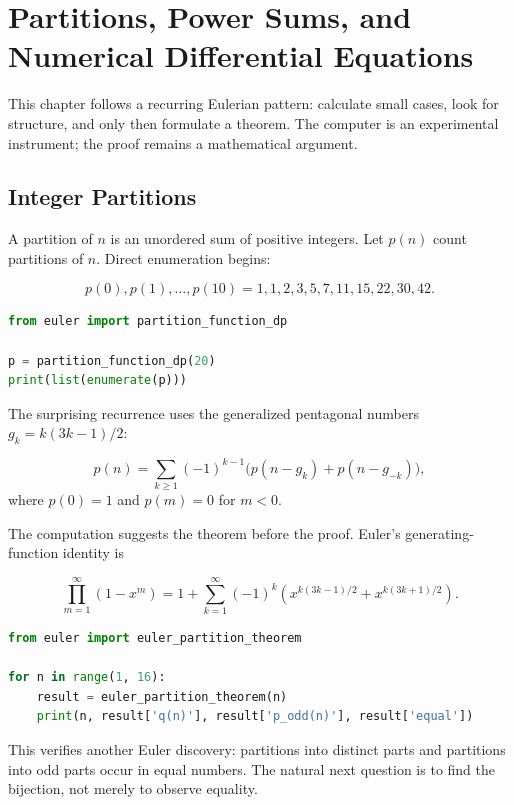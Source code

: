 \chapter{Partitions, Power Sums, and Numerical Differential Equations}
\label{ch:discovery_partitions_calculus}

This chapter follows a recurring Eulerian pattern: calculate small cases, look for
structure, and only then formulate a theorem. The computer is an experimental
instrument; the proof remains a mathematical argument.

\section{Integer Partitions}

A partition of $n$ is an unordered sum of positive integers. Let $p(n)$ count
partitions of $n$. Direct enumeration begins:

\[
p(0),p(1),\ldots,p(10)=1,1,2,3,5,7,11,15,22,30,42.
\]

\begin{lstlisting}[language=Python]
from euler import partition_function_dp

p = partition_function_dp(20)
print(list(enumerate(p)))
\end{lstlisting}

The surprising recurrence uses the generalized pentagonal numbers
$g_k=k(3k-1)/2$:

\begin{theorem}
\[
p(n)=\sum_{k\geq1}(-1)^{k-1}\bigl(p(n-g_k)+p(n-g_{-k})\bigr),
\]
where $p(0)=1$ and $p(m)=0$ for $m<0$.
\end{theorem}

The computation suggests the theorem before the proof. Euler's generating-function
identity is

\[
\prod_{m=1}^{\infty}(1-x^m)=1+\sum_{k=1}^{\infty}(-1)^k
\left(x^{k(3k-1)/2}+x^{k(3k+1)/2}\right).
\]

\begin{lstlisting}[language=Python]
from euler import euler_partition_theorem

for n in range(1, 16):
    result = euler_partition_theorem(n)
    print(n, result['q(n)'], result['p_odd(n)'], result['equal'])
\end{lstlisting}

This verifies another Euler discovery: partitions into distinct parts and partitions
into odd parts occur in equal numbers. The natural next question is to find the
bijection, not merely to observe equality.

